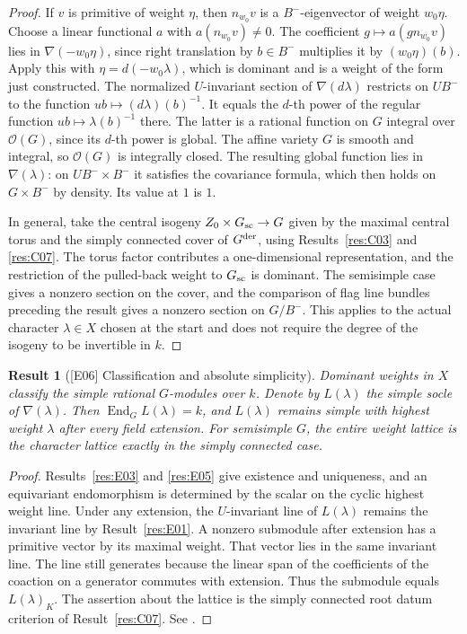 \documentclass[11pt,a4paper,openany,oneside]{book}
\theoremstyle{resultstyle}
\newtheorem{statement}{Result}[chapter]
\newenvironment{result}[2]{\clubpenalty=10000\begin{statement}[\textnormal{[#1]} #2]\leavevmode\label{res:#1}\ignorespaces}{\end{statement}}
\theoremstyle{definition}
\numberwithin{equation}{chapter}
\begin{document}
\begin{proof}
If \(v\) is primitive of weight \(\eta\), then \(n_{w_0}v\) is a \(B^-\)-eigenvector of weight \(w_0\eta\). Choose a linear functional \(a\) with \(a(n_{w_0}v)\ne0\). The coefficient \(g\mapsto a(g n_{w_0}v)\) lies in \(\nabla(-w_0\eta)\), since right translation by \(b\in B^-\) multiplies it by \((w_0\eta)(b)\). Apply this with \(\eta=d(-w_0\lambda)\), which is dominant and is a weight of the form just constructed. The normalized \(U\)-invariant section of \(\nabla(d\lambda)\) restricts on \(UB^-\) to the function \(ub\mapsto(d\lambda)(b)^{-1}\). It equals the \(d\)-th power of the regular function \(ub\mapsto\lambda(b)^{-1}\) there. The latter is a rational function on \(G\) integral over \(\mathcal O(G)\), since its \(d\)-th power is global. The affine variety \(G\) is smooth and integral, so \(\mathcal O(G)\) is integrally closed. The resulting global function lies in \(\nabla(\lambda)\): on \(UB^-\times B^-\) it satisfies the covariance formula, which then holds on \(G\times B^-\) by density. Its value at \(1\) is \(1\).

In general, take the central isogeny \(Z_0\times G_{\rm sc}\to G\) given by the maximal central torus and the simply connected cover of \(G^{\rm der}\), using Results~\ref{res:C03} and \ref{res:C07}. The torus factor contributes a one-dimensional representation, and the restriction of the pulled-back weight to \(G_{\rm sc}\) is dominant. The semisimple case gives a nonzero section on the cover, and the comparison of flag line bundles preceding the result gives a nonzero section on \(G/B^-\). This applies to the actual character \(\lambda\in X\) chosen at the start and does not require the degree of the isogeny to be invertible in \(k\).
\end{proof}

\begin{result}{E06}{Classification and absolute simplicity}
Dominant weights in \(X\) classify the simple rational \(G\)-modules over \(k\). Denote by \(L(\lambda)\) the simple socle of \(\nabla(\lambda)\). Then \(\operatorname{End}_G L(\lambda)=k\), and \(L(\lambda)\) remains simple with highest weight \(\lambda\) after every field extension. For semisimple \(G\), the entire weight lattice is the character lattice exactly in the simply connected case.
\end{result}
\begin{proof}
Results~\ref{res:E03} and \ref{res:E05} give existence and uniqueness, and an equivariant endomorphism is determined by the scalar on the cyclic highest weight line. Under any extension, the \(U\)-invariant line of \(L(\lambda)\) remains the invariant line by Result~\ref{res:E01}. A nonzero submodule after extension has a primitive vector by its maximal weight. That vector lies in the same invariant line. The line still generates because the linear span of the coefficients of the coaction on a generator commutes with extension. Thus the submodule equals \(L(\lambda)_K\). The assertion about the lattice is the simply connected root datum criterion of Result~\ref{res:C07}. See \cite[22.8--22.12 and 22.27]{milne}.
\end{proof}
\end{document}
